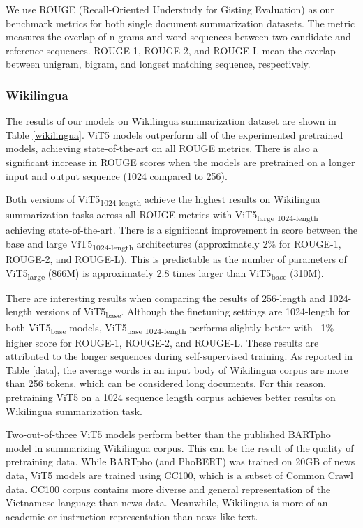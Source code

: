 \documentclass[11pt,a4paper]{article}
\begin{document}
We use ROUGE (Recall-Oriented Understudy for Gisting Evaluation) as our benchmark metrics for both single document summarization datasets. The metric measures the overlap of n-grams and word sequences between two candidate and reference sequences. ROUGE-1, ROUGE-2, and ROUGE-L mean the overlap between unigram, bigram, and longest matching sequence, respectively.

\subsubsection{Wikilingua}


\label{vietnews_task}
The results of our models on Wikilingua summarization dataset are shown in Table \ref{wikilingua}. 
ViT5 models outperform all of the experimented pretrained models, achieving state-of-the-art on all ROUGE metrics. There is also a significant increase in ROUGE scores when the models are pretrained on a longer input and output sequence (1024 compared to 256). 

Both versions of ViT5\textsubscript{1024-length} achieve the highest results on Wikilingua summarization tasks across all ROUGE metrics with ViT5\textsubscript{large 1024-length} achieving state-of-the-art. There is a significant improvement in score between the base and large ViT5\textsubscript{1024-length} architectures (approximately 2\% for ROUGE-1, ROUGE-2, and ROUGE-L). This is predictable as the number of parameters of ViT5\textsubscript{large} (866M) is approximately 2.8 times larger than ViT5\textsubscript{base} (310M).

There are interesting results when comparing the results of 256-length and 1024-length versions of ViT5\textsubscript{base}. Although the finetuning settings are 1024-length for both ViT5\textsubscript{base} models, ViT5\textsubscript{base 1024-length} performs slightly better with ~1\% higher score for ROUGE-1, ROUGE-2, and ROUGE-L. These results are attributed to the longer sequences during self-supervised training. As reported in Table \ref{data}, the average words in an input body of Wikilingua corpus are more than 256 tokens, which can be considered long documents. For this reason, pretraining ViT5 on a 1024 sequence length corpus achieves better results on Wikilingua summarization task.

Two-out-of-three ViT5 models perform better than the published BARTpho model in summarizing Wikilingua corpus. This can be the result of the quality of pretraining data. While BARTpho (and PhoBERT) was trained on 20GB of news data, ViT5 models are trained using CC100, which is a subset of Common Crawl data. CC100 corpus contains more diverse and general representation of the Vietnamese language than news data. Meanwhile, Wikilingua is more of an academic or instruction representation than news-like text. 
\end{document}
